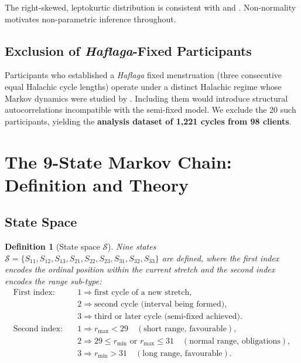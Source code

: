 \documentclass[12pt,a4paper]{article}
\newtheorem{definition}{Definition}
\newcommand{\haflaga}{\textit{Haflaga}}
\begin{document}
The right-skewed, leptokurtic distribution is consistent with
\citet{Guo2006} and \citet{Bull2019}.  Non-normality motivates non-parametric
inference throughout.

\subsection{Exclusion of \haflaga-Fixed Participants}
\label{sec:exclusion}

Participants who established a \haflaga{} fixed menstruation (three consecutive
equal Halachic cycle lengths) operate under a distinct Halachic regime whose
Markov dynamics were studied by \citet{Ross2024markov}.  Including them would
introduce structural autocorrelations incompatible with the semi-fixed model.
We exclude the 20 such participants, yielding the
\textbf{analysis dataset of 1{,}221 cycles from 98 clients}.

\section{The 9-State Markov Chain: Definition and Theory}
\label{sec:model}

\subsection{State Space}
\label{sec:states}

\begin{definition}[State space $\mathcal{S}$]\label{def:states}
Nine states $\mathcal{S} = \{S_{11}, S_{12}, S_{13},
S_{21}, S_{22}, S_{23}, S_{31}, S_{32}, S_{33}\}$ are defined, where the
\emph{first index} encodes the ordinal position within the current stretch and
the \emph{second index} encodes the range sub-type:
\begin{align*}
\text{First index:}\quad
  &1 \Rightarrow \text{first cycle of a new stretch},\\
  &2 \Rightarrow \text{second cycle (interval being formed)},\\
  &3 \Rightarrow \text{third or later cycle (semi-fixed achieved)}.\\[4pt]
\text{Second index:}\quad
  &1 \Rightarrow r_{\max} < 29 \quad (\text{short range, favourable}),\\
  &2 \Rightarrow 29 \le r_{\min} \text{ or } r_{\max} \le 31
                 \quad (\text{normal range, obligations}),\\
  &3 \Rightarrow r_{\min} > 31 \quad (\text{long range, favourable}).
\end{align*}
\end{definition}
\end{document}
